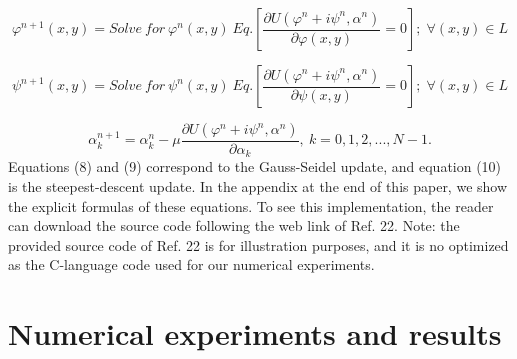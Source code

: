 \begin{equation}
\varphi^{n+1}(x,y)=Solve\: for\:\varphi^{n}(x,y)\: Eq.\left[\frac{\partial U(
\varphi^{n}+i\psi^{n},\alpha^{n})}{\partial\varphi(x,y)}=0\right];\;\forall(x,y)
\in L
\end{equation}


\begin{equation}
\psi^{n+1}(x,y)=Solve\: for\:\psi^{n}(x,y)\: Eq.\left[\frac{\partial U(\varphi^{
n}+i\psi^{n},\alpha^{n})}{\partial\psi(x,y)}=0\right];\;\forall(x,y)\in L
\end{equation}


\begin{equation}
\alpha_{k}^{n+1}=\alpha_{k}^{n}-\mu\frac{\partial U(\varphi^{n}+i\psi^{n},
\alpha^{n})}{\partial\alpha_{k}},\: k=0,1,2,...,N-1.
\end{equation}
Equations (8) and (9) correspond to the Gauss-Seidel update, and equation
(10) is the steepest-descent update. In the appendix at the end of
this paper, we show the explicit formulas of these equations. To see
this implementation, the reader can download the source code following
the web link of Ref. 22. Note: the provided source code of Ref. 22
is for illustration purposes, and it is no optimized as the C-language
code used for our numerical experiments.


\section{Numerical experiments and results}

